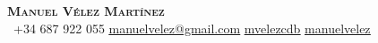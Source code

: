 \begin{center}
    \textbf{\Huge \scshape Manuel Vélez Martínez} \\ \vspace{8pt}
     \ \small +34 687 922 055 \quad
    \href{mailto:manuelvelez@gmail.com}{ \underline{manuelvelez@gmail.com}} \quad
    \href{https://www.linkedin.com/in/mvelezcdb/}{ \underline{mvelezcdb}} \quad
    \href{https://github.com/manuelvelez}{ \underline{manuelvelez}}
\end{center}